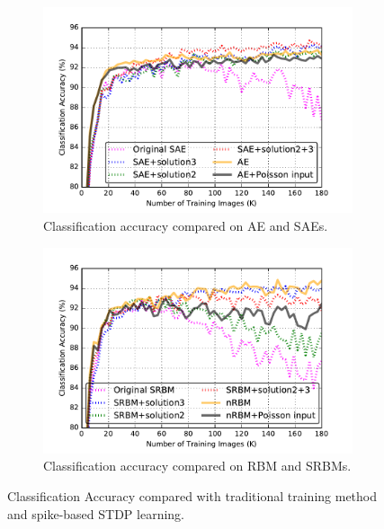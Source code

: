 \begin{figure}
	\centering
	\begin{subfigure}[t]{0.45\textwidth}
		\includegraphics[width=\textwidth]{pics_sdlm/43_MNIST_SAE_all/compare_result.pdf}
		\caption{Classification accuracy compared on AE and SAEs.}
	\end{subfigure}
	\begin{subfigure}[t]{0.45\textwidth}
		\includegraphics[width=\textwidth]{pics_sdlm/53_MNIST_SRBM_all/compare_result.pdf}
		\caption{Classification accuracy compared on RBM and SRBMs.}
	\end{subfigure}
	\caption{Classification Accuracy compared with traditional training method and spike-based STDP learning.}
\end{figure}

